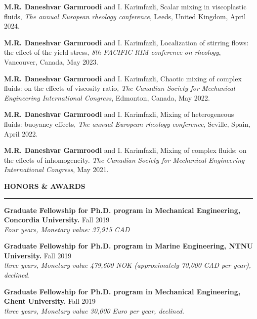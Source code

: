 \documentclass[10pt]{article}
\begin{document}
		\noindent \textbf{M.R. Daneshvar Garmroodi} and I. Karimfazli, Scalar mixing in viscoplastic fluids, \textit{The annual European rheology conference}, Leeds, United Kingdom, April 2024.
		
		\noindent \textbf{M.R. Daneshvar Garmroodi} and I. Karimfazli, Localization of stirring flows: the effect of the yield stress, \textit{8th PACIFIC RIM conference on rheology}, Vancouver, Canada, May 2023.
		
		\noindent \textbf{M.R. Daneshvar Garmroodi} and I. Karimfazli, Chaotic mixing of complex fluids: on the effects of viscosity ratio, \textit{The Canadian Society for Mechanical Engineering International Congress}, Edmonton, Canada, May 2022.
		
		\noindent \textbf{M.R. Daneshvar Garmroodi} and I. Karimfazli, Mixing of heterogeneous fluids: buoyancy effects, \textit{The annual European rheology conference}, Seville, Spain, April 2022.
		
		\noindent \textbf{M.R. Daneshvar Garmroodi} and I. Karimfazli, Mixing of complex fluids: on the effects of inhomogeneity. \textit{The Canadian Society for Mechanical Engineering International Congress}, May 2021.
		
		\vspace{4mm}
		
		\vspace{1.5mm}
		
		\noindent \textbf{\color{violet} HONORS \& AWARDS}
		
		\vspace{-2mm}
		
		\noindent\rule[0.5ex]{\linewidth}{1pt}
		
	\noindent \textbf {\small  Graduate Fellowship for Ph.D. program in Mechanical Engineering, Concordia University.} \hfill {Fall 2019} 
		\\ \textit{Four years, Monetary value: 37,915 CAD}
		
	
		
	\noindent \textbf {\small Graduate Fellowship for Ph.D. program in Marine Engineering, NTNU University.} \hfill {Fall 2019} 
		\\ \textit{three years, Monetary value 479,600 NOK (approximately 70,000 CAD per year), declined.}
		
		
	\noindent \textbf {\small  Graduate Fellowship for Ph.D. program in Mechanical Engineering, Ghent University.} \hfill {Fall 2019} 
		\\ \textit{three years, Monetary value 30,000 Euro per year, declined.}
		
\end{document}
